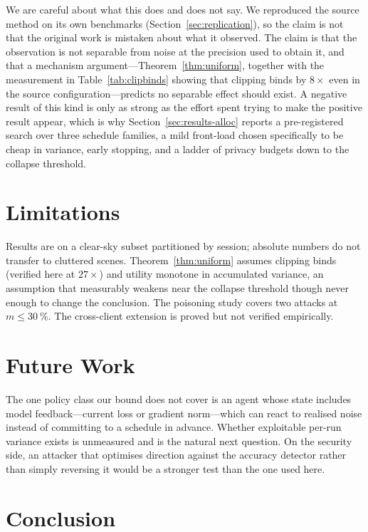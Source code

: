 We are careful about what this does and does not say. We reproduced the source
method on its own benchmarks (Section~\ref{sec:replication}), so the claim is not
that the original work is mistaken about what it observed. The claim is that the
observation is not separable from noise at the precision used to obtain it, and
that a mechanism argument---Theorem~\ref{thm:uniform}, together with the
measurement in Table~\ref{tab:clipbinds} showing that clipping binds by
$8\times$ even in the source configuration---predicts no separable effect should
exist. A negative result of this kind is only as strong as the effort spent
trying to make the positive result appear, which is why
Section~\ref{sec:results-alloc} reports a pre-registered search over three
schedule families, a mild front-load chosen specifically to be cheap in variance,
early stopping, and a ladder of privacy budgets down to the collapse threshold.

\section{Limitations}

Results are on a clear-sky subset partitioned by session; absolute numbers do not
transfer to cluttered scenes. Theorem~\ref{thm:uniform} assumes clipping binds
(verified here at $27\times$) and utility monotone in accumulated variance, an
assumption that measurably weakens near the collapse threshold though never
enough to change the conclusion. The poisoning study covers two attacks at
$m\le\SI{30}{\percent}$. The cross-client extension is proved but not verified
empirically.

\section{Future Work}

The one policy class our bound does not cover is an agent whose state includes
model feedback---current loss or gradient norm---which can react to realised
noise instead of committing to a schedule in advance. Whether exploitable
per-run variance exists is unmeasured and is the natural next question. On the
security side, an attacker that optimises direction against the accuracy detector
rather than simply reversing it would be a stronger test than the one used here.

\section{Conclusion}

